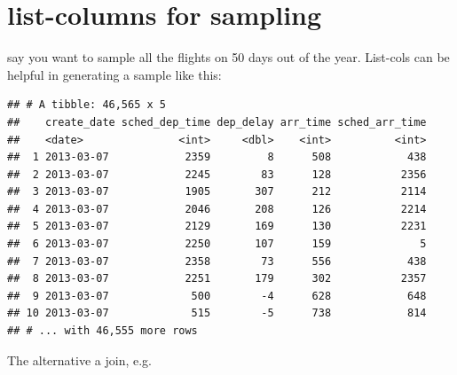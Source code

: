 \documentclass[]{book}
\newenvironment{Shaded}{\begin{snugshade}}{\end{snugshade}}
\newcommand{\DataTypeTok}[1]{\textcolor[rgb]{0.13,0.29,0.53}{#1}}
\newcommand{\DecValTok}[1]{\textcolor[rgb]{0.00,0.00,0.81}{#1}}
\newcommand{\KeywordTok}[1]{\textcolor[rgb]{0.13,0.29,0.53}{\textbf{#1}}}
\newcommand{\NormalTok}[1]{#1}
\newcommand{\OperatorTok}[1]{\textcolor[rgb]{0.81,0.36,0.00}{\textbf{#1}}}
\newcommand{\StringTok}[1]{\textcolor[rgb]{0.31,0.60,0.02}{#1}}
\theoremstyle{definition}
\theoremstyle{definition}
\theoremstyle{definition}
\theoremstyle{remark}
\begin{document}
\hypertarget{list-columns-for-sampling}{%
\section{list-columns for sampling}\label{list-columns-for-sampling}}

say you want to sample all the flights on 50 days out of the year.
List-cols can be helpful in generating a sample like this:

\begin{Shaded}
\end{Shaded}

\begin{verbatim}
## # A tibble: 46,565 x 5
##    create_date sched_dep_time dep_delay arr_time sched_arr_time
##    <date>               <int>     <dbl>    <int>          <int>
##  1 2013-03-07            2359         8      508            438
##  2 2013-03-07            2245        83      128           2356
##  3 2013-03-07            1905       307      212           2114
##  4 2013-03-07            2046       208      126           2214
##  5 2013-03-07            2129       169      130           2231
##  6 2013-03-07            2250       107      159              5
##  7 2013-03-07            2358        73      556            438
##  8 2013-03-07            2251       179      302           2357
##  9 2013-03-07             500        -4      628            648
## 10 2013-03-07             515        -5      738            814
## # ... with 46,555 more rows
\end{verbatim}

The alternative a join, e.g.
\end{document}
